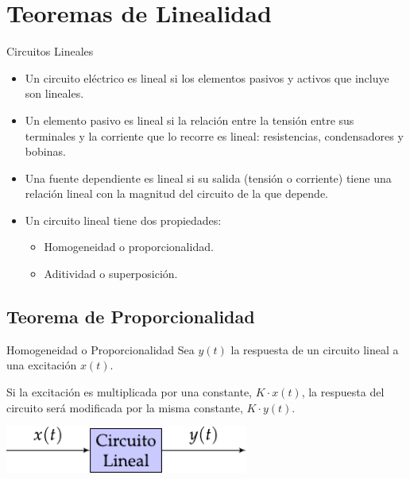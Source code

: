 \documentclass[aspectratio=169, usenames,svgnames,dvipsnames]{beamer}
\begin{document}
\section{Teoremas de Linealidad}
\label{sec:orgb5cd630}
\begin{frame}[label={sec:org98452ea}]{Circuitos Lineales}
\begin{itemize}
\item Un circuito eléctrico es lineal si los elementos pasivos y activos que incluye son lineales.
\item Un \alert{elemento pasivo} es lineal si la relación entre la tensión entre sus terminales y la corriente que lo recorre es lineal: \alert{resistencias, condensadores y bobinas}.
\item Una \alert{fuente dependiente} es lineal si su salida (tensión o corriente) tiene una relación lineal con la magnitud del circuito de la que depende.
\item Un circuito lineal tiene dos propiedades:
\begin{itemize}
\item Homogeneidad o \alert{proporcionalidad}.
\item Aditividad o \alert{superposición}.
\end{itemize}
\end{itemize}
\end{frame}

\subsection{Teorema de Proporcionalidad}
\label{sec:org57f9055}

\begin{frame}[label={sec:org858a118}]{Homogeneidad o Proporcionalidad}
Sea \(y(t)\) la respuesta de un \alert{circuito lineal} a una excitación \(x(t)\). 

Si la excitación es multiplicada por una \alert{constante}, \(K \cdot x(t)\), la respuesta del circuito será modificada por la misma constante, \(K \cdot y(t)\).

\begin{center}
\includegraphics[width=0.6\textwidth]{../figs/proporcionalidad.pdf}
\end{center}
\end{frame}
\end{document}
